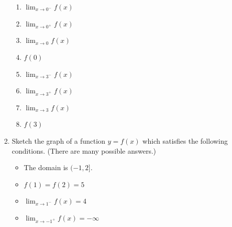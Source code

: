 \documentclass[12pt]{article}
\newif\ifans
\begin{document}
\begin{enumerate}
\begin{enumerate}

\item $\displaystyle \lim_{x \rightarrow 0^{-}}{f(x)}$

\ifans{\fbox{$2$}} \fi

\item $\displaystyle \lim_{x \rightarrow 0^{+}}{f(x)}$

\ifans{\fbox{$6$}} \fi

\item $\displaystyle \lim_{x \rightarrow 0}{f(x)}$

\ifans{\fbox{DNE because $\displaystyle \lim_{x \rightarrow 0^{-}}f(x) \neq \lim_{x \rightarrow 0^{+}}f(x)$}} \fi

\item $f(0)$

\ifans{\fbox{Undefined}} \fi

\item $\displaystyle \lim_{x \rightarrow 3^{-}}{f(x)}$

\ifans{\fbox{$-3$}} \fi

\item $\displaystyle \lim_{x \rightarrow 3^{+}}{f(x)}$

\ifans{\fbox{$-3$}} \fi

\item $\displaystyle \lim_{x \rightarrow 3}{f(x)}$

\ifans{\fbox{$-3$}} \fi

\item $f(3)$

\ifans{\fbox{$-3$}} \fi

\end{enumerate}

\newpage

\item Sketch the graph of a function $y=f(x)$ which satisfies the following conditions. (There are many possible answers.)

\begin{itemize}

\item The domain is $(-1,2]$.

\item $f(1)=f(2)=5$

\item $\displaystyle \lim_{x\rightarrow 1^{-}}{f(x)}=4$

\item $\displaystyle \lim_{x\rightarrow -1^{+}}{f(x)}=-\infty$


\end{itemize}
\end{enumerate}
\end{document}
